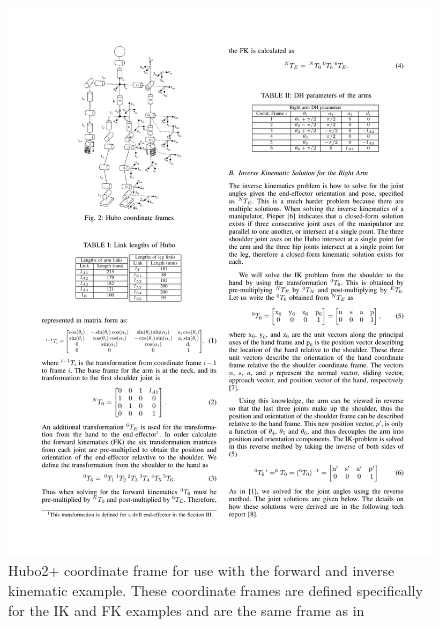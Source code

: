 \begin{figure}[thpb]
  \centering
\includegraphics[width=0.8\columnwidth]{./examples/pix/hubo2GTechFrame.pdf}
\caption{Hubo2+ coordinate frame for use with the forward and inverse kinematic example.  These coordinate frames are defined specifically for the IK and FK examples and are the same frame as in\cite{5649842}}
\label{fig:IkFkCoordinate}
\end{figure}

